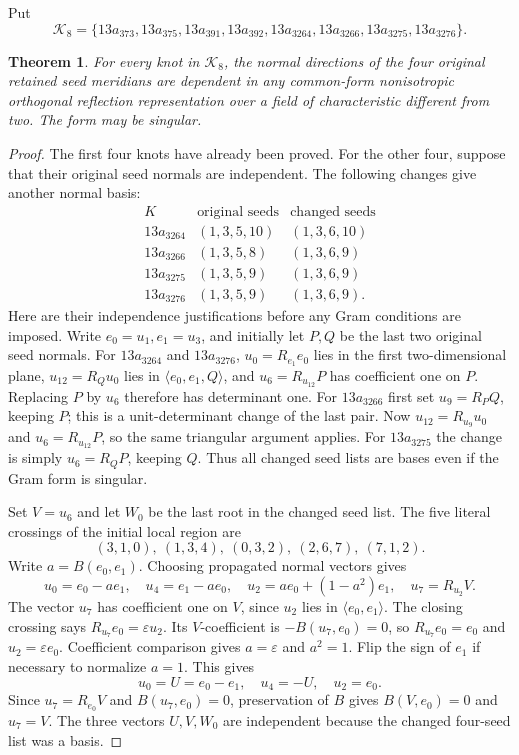 \documentclass[11pt]{article}
\newtheorem{theorem}{Theorem}
\begin{document}
Put
\[
\mathcal K_8=\{13a_{373},13a_{375},13a_{391},13a_{392},
13a_{3264},13a_{3266},13a_{3275},13a_{3276}\}.
\]

\begin{theorem}\label{thm:alternating8}
For every knot in $\mathcal K_8$, the normal directions of the four
original retained seed meridians are dependent in any common-form
nonisotropic orthogonal reflection representation over a field of
characteristic different from two. The form may be singular.
\end{theorem}
\begin{proof}
The first four knots have already been proved. For the other four,
suppose that their original seed normals are independent. The
following changes give another normal basis:
\[
\begin{array}{c|c|c}
 K&\text{original seeds}&\text{changed seeds}\\\hline
13a_{3264}&(1,3,5,10)&(1,3,6,10)\\
13a_{3266}&(1,3,5,8)&(1,3,6,9)\\
13a_{3275}&(1,3,5,9)&(1,3,6,9)\\
13a_{3276}&(1,3,5,9)&(1,3,6,9).
\end{array}
\]
Here are their independence justifications before any Gram conditions
are imposed. Write $e_0=u_1,e_1=u_3$, and initially let $P,Q$ be
the last two original seed normals. For $13a_{3264}$ and
$13a_{3276}$, $u_0=R_{e_1}e_0$ lies in the first two-dimensional
plane, $u_{12}=R_Qu_0$ lies in $\langle e_0,e_1,Q\rangle$, and
$u_6=R_{u_{12}}P$ has coefficient one on $P$. Replacing $P$ by
$u_6$ therefore has determinant one.
For $13a_{3266}$ first set $u_9=R_PQ$, keeping $P$; this is a
unit-determinant change of the last pair. Now $u_{12}=R_{u_9}u_0$
and $u_6=R_{u_{12}}P$, so the same triangular argument applies.
For $13a_{3275}$ the change is simply $u_6=R_QP$, keeping $Q$.
Thus all changed seed lists are bases even if the Gram form is singular.

Set $V=u_6$ and let $W_0$ be the last root in the changed seed list.
The five literal crossings of the initial local region are
\[
              (3,1,0),\ (1,3,4),\ (0,3,2),\ (2,6,7),\ (7,1,2).
\]
Write $a=B(e_0,e_1)$. Choosing propagated normal vectors gives
\[
 u_0=e_0-ae_1,\quad u_4=e_1-ae_0,\quad
 u_2=ae_0+(1-a^2)e_1,\quad u_7=R_{u_2}V.
\]
The vector $u_7$ has coefficient one on $V$, since $u_2$ lies in
$\langle e_0,e_1\rangle$. The closing crossing says
$R_{u_7}e_0=\varepsilon u_2$. Its $V$-coefficient is
$-B(u_7,e_0)=0$, so $R_{u_7}e_0=e_0$ and
$u_2=\varepsilon e_0$. Coefficient comparison gives
$a=\varepsilon$ and $a^2=1$. Flip the sign of $e_1$ if necessary to
normalize $a=1$. This gives
\[
                  u_0=U=e_0-e_1,\quad u_4=-U,\quad u_2=e_0.
\]
Since $u_7=R_{e_0}V$ and $B(u_7,e_0)=0$, preservation of $B$ gives
$B(V,e_0)=0$ and $u_7=V$. The three vectors $U,V,W_0$ are independent
because the changed four-seed list was a basis.


\end{proof}
\end{document}
